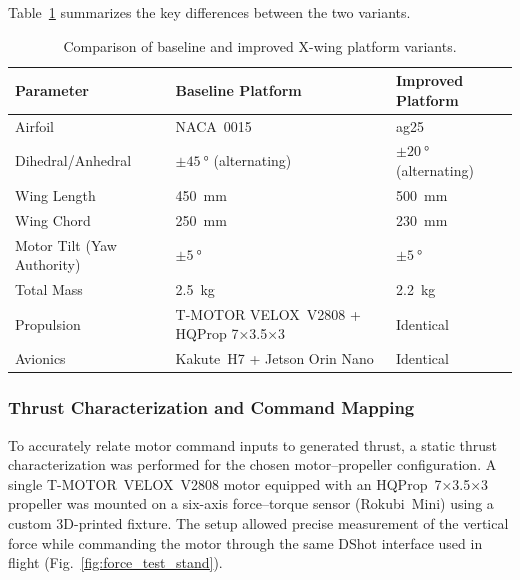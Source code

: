 Table~\ref{tab:platform_comparison} summarizes the key differences between the two variants.

\begin{table}[h]
\centering
\caption{Comparison of baseline and improved X-wing platform variants.}
\label{tab:platform_comparison}
\small
\begin{tabularx}{\textwidth}{lXX}
\toprule
Parameter & Baseline Platform & Improved Platform \\
\midrule
Airfoil & NACA~0015 & ag25 \\
Dihedral/Anhedral & $\pm\SI{45}{\degree}$ (alternating) & $\pm\SI{20}{\degree}$ (alternating) \\
Wing Length & \SI{450}{\milli\meter} & \SI{500}{\milli\meter} \\
Wing Chord & \SI{250}{\milli\meter} & \SI{230}{\milli\meter} \\
Motor Tilt (Yaw Authority) & $\pm\SI{5}{\degree}$ & $\pm\SI{5}{\degree}$ \\
Total Mass & \SI{2.5}{\kilogram} & \SI{2.2}{\kilogram} \\
Propulsion & T-MOTOR VELOX~V2808 + HQProp 7×3.5×3 & Identical \\
Avionics & Kakute~H7 + Jetson Orin Nano & Identical \\
\bottomrule
\end{tabularx}
\end{table}

\subsubsection{Thrust Characterization and Command Mapping}
To accurately relate motor command inputs to generated thrust, a static thrust characterization was performed for the chosen motor–propeller configuration.  
A single T-MOTOR~VELOX~V2808 motor equipped with an HQProp~7×3.5×3 propeller was mounted on a six-axis force–torque sensor (Rokubi~Mini) using a custom 3D-printed fixture.  
The setup allowed precise measurement of the vertical force while commanding the motor through the same DShot interface used in flight (Fig.~\ref{fig:force_test_stand}).

